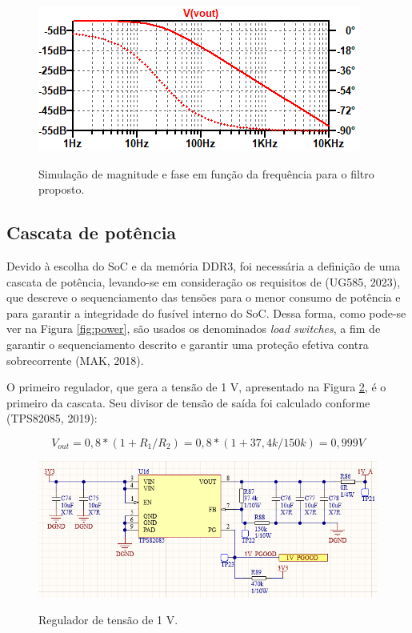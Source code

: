 \begin{figure}[H]
    \centering
    \caption{Simulação de magnitude e fase em função da frequência para o filtro proposto.}
    \includegraphics[scale=1]{images/filtrof.png}
    \label{fig:filtrof}
\end{figure}

\subsection{Cascata de potência}

Devido à escolha do SoC e da memória DDR3, foi necessária a definição de uma cascata de potência, levando-se em consideração os requisitos de (UG585, 2023), que descreve o sequenciamento das tensões para o menor consumo de potência e para garantir a integridade do fusível interno do SoC. Dessa forma, como pode-se ver na Figura \ref{fig:power}, são usados os denominados \textit{load switches}, a fim de garantir o sequenciamento descrito e garantir uma proteção efetiva contra sobrecorrente (MAK, 2018). 

O primeiro regulador, que gera a tensão de 1 V, apresentado na Figura \ref{fig:1vsupp}, é o primeiro da cascata. Seu divisor de tensão de saída foi calculado conforme (TPS82085, 2019):

\begin{equation}
	V_{out} = 0,8 * (1 + R_1/R_2) = 0,8 * (1+ 37,4k/150k) = 0,999 V
\end{equation} 

\begin{figure}[H]
    \centering
    \caption{Regulador de tensão de 1 V.}
    \includegraphics[scale=0.8]{images/1vsupp.png}
    \label{fig:1vsupp}
\end{figure}

